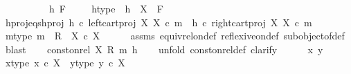 \begin{isabellebody}
\ \ \isamarkupfalse%
\ \ \ \isanewline
{}\isamarkupfalse%
\isanewline
\ \ \isamarkupfalse%
\ h\ F\ \isanewline
\ \ \isamarkupfalse%
\ h{\isacharunderscore}{\kern0pt}type{\isacharcolon}{\kern0pt}\ {\isachardoublequoteopen}\ h\ {\isacharcolon}{\kern0pt}\ X\ {\isasymrightarrow}\ F{\isachardoublequoteclose}\isanewline
\ \ \isamarkupfalse%
\ h{\isacharunderscore}{\kern0pt}proj{}{\isacharunderscore}{\kern0pt}eqs{\isacharunderscore}{\kern0pt}h{\isacharunderscore}{\kern0pt}proj{}{\isacharcolon}{\kern0pt}\ {\isachardoublequoteopen}h\ {\isasymcirc}\isactrlsub c\ left{\isacharunderscore}{\kern0pt}cart{\isacharunderscore}{\kern0pt}proj\ X\ X\ {\isasymcirc}\isactrlsub c\ m\ {\isacharequal}{\kern0pt}\ h\ {\isasymcirc}\isactrlsub c\ right{\isacharunderscore}{\kern0pt}cart{\isacharunderscore}{\kern0pt}proj\ X\ X\ {\isasymcirc}\isactrlsub c\ m{\isachardoublequoteclose}\isanewline
\isanewline
\ \ \isamarkupfalse%
\ m{\isacharunderscore}{\kern0pt}type{\isacharcolon}{\kern0pt}\ {\isachardoublequoteopen}m\ {\isacharcolon}{\kern0pt}\ R\ {\isasymrightarrow}\ X\ {\isasymtimes}\isactrlsub c\ X{\isachardoublequoteclose}\isanewline
\ \ \ \ \isamarkupfalse%
\ assms\ equiv{\isacharunderscore}{\kern0pt}rel{\isacharunderscore}{\kern0pt}on{\isacharunderscore}{\kern0pt}def\ reflexive{\isacharunderscore}{\kern0pt}on{\isacharunderscore}{\kern0pt}def\ subobject{\isacharunderscore}{\kern0pt}of{\isacharunderscore}{\kern0pt}def{}\ \isamarkupfalse%
\ blast\isanewline
\ \ \isamarkupfalse%
\ {\isachardoublequoteopen}const{\isacharunderscore}{\kern0pt}on{\isacharunderscore}{\kern0pt}rel\ X\ {\isacharparenleft}{\kern0pt}R{\isacharcomma}{\kern0pt}\ m{\isacharparenright}{\kern0pt}\ h{\isachardoublequoteclose}\isanewline
\ \ \isamarkupfalse%
\ {\isacharparenleft}{\kern0pt}unfold\ const{\isacharunderscore}{\kern0pt}on{\isacharunderscore}{\kern0pt}rel{\isacharunderscore}{\kern0pt}def{\isacharcomma}{\kern0pt}\ clarify{\isacharparenright}{\kern0pt}\isanewline
\ \ \ \ \isamarkupfalse%
\ x\ y\isanewline
\ \ \ \ \isamarkupfalse%
\ x{\isacharunderscore}{\kern0pt}type{\isacharcolon}{\kern0pt}\ {\isachardoublequoteopen}x\ {\isasymin}\isactrlsub c\ X{\isachardoublequoteclose}\ \ y{\isacharunderscore}{\kern0pt}type{\isacharcolon}{\kern0pt}\ {\isachardoublequoteopen}y\ {\isasymin}\isactrlsub c\ X{\isachardoublequoteclose}\isanewline
\ \ \ \ \isamarkupfalse%

\end{isabellebody}
